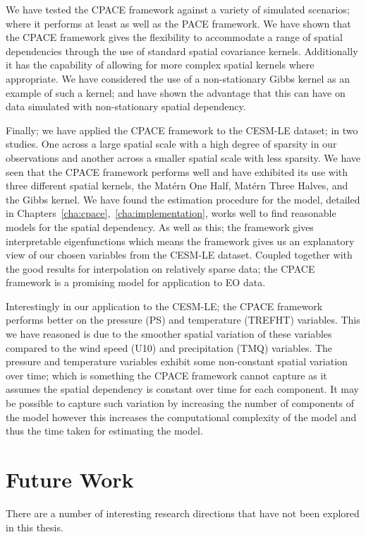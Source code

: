 We have tested the CPACE framework against a variety of simulated scenarios; where it performs at least as well as the PACE framework.
We have shown that the CPACE framework gives the flexibility to accommodate a range of spatial dependencies through the use of standard spatial covariance kernels.
Additionally it has the capability of allowing for more complex spatial kernels where appropriate.
We have considered the use of a non-stationary Gibbs kernel as an example of such a kernel; and have shown the advantage that this can have on data simulated with non-stationary spatial dependency.

Finally; we have applied the CPACE framework to the CESM-LE dataset; in two studies.
One across a large spatial scale with a high degree of sparsity in our observations and another across a smaller spatial scale with less sparsity.
We have seen that the CPACE framework performs well and have exhibited its use with three different spatial kernels, the Mat\'ern One Half, Mat\'ern Three Halves, and the Gibbs kernel.
We have found the estimation procedure for the model, detailed in Chapters~\ref{cha:cpace},~\ref{cha:implementation}, works well to find reasonable models for the spatial dependency. 
As well as this; the framework gives interpretable eigenfunctions which means the framework gives us an explanatory view of our chosen variables from the CESM-LE dataset.
Coupled together with the good results for interpolation on relatively sparse data; the CPACE framework is a promising model for application to EO data.

Interestingly in our application to the CESM-LE; the CPACE framework performs better on the pressure (PS) and temperature (TREFHT) variables.
This we have reasoned is due to the smoother spatial variation of these variables compared to the wind speed (U10) and precipitation (TMQ) variables.
The pressure and temperature variables exhibit some non-constant spatial variation over time; which is something the CPACE framework cannot capture as it assumes the spatial dependency is constant over time for each component.
It may be possible to capture such variation by increasing the number of components of the model however  this increases the computational complexity of the model and thus the time taken for estimating the model. 

\section{Future Work\label{sec:future_work}}
There are a number of interesting research directions that have not been explored in this thesis.

